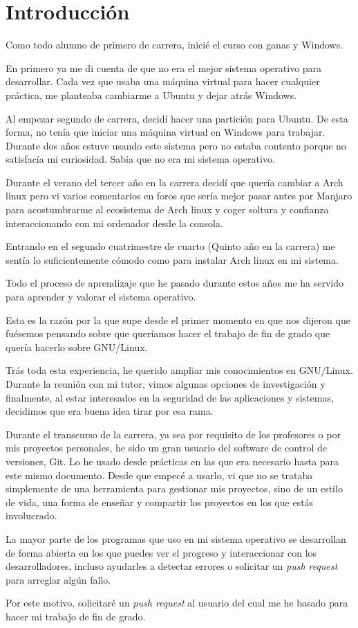 \documentclass[titlepage, 12pt, a4paper]{article}
\begin{document}
\section{Introducción}
Como todo alumno de primero de carrera, inicié el curso con ganas y Windows.\par En primero ya me di cuenta de que no era el mejor sistema operativo para desarrollar. Cada vez que usaba una máquina virtual para hacer cualquier práctica, me planteaba cambiarme a \Gls{Ubuntu} y dejar atrás Windows.\par Al empezar segundo de carrera, decidí hacer una partición para \Gls{Ubuntu}. De esta forma, no tenía que iniciar una máquina virtual en Windows para trabajar. Durante dos años estuve usando este sistema pero no estaba contento porque no satisfacía mi curiosidad. Sabía que no era mi sistema operativo.\par Durante el verano del tercer año en la carrera decidí que quería cambiar a \Gls{Arch linux} pero vi varios comentarios en foros que sería mejor pasar antes por \Gls{Manjaro} para acostumbrarme al ecosistema de \Gls{Arch linux} y coger soltura y confianza interaccionando con mi ordenador desde la consola.\par Entrando en el segundo cuatrimestre de cuarto (Quinto año en la carrera) me sentía lo suficientemente cómodo como para instalar \Gls{Arch linux} en mi sistema.\par Todo el proceso de aprendizaje que he pasado durante estos años me ha servido para aprender y valorar el sistema operativo.\par Esta es la razón por la que supe desde el primer momento en que nos dijeron que fuésemos pensando sobre que queríamos hacer el trabajo de fin de grado que quería hacerlo sobre \Gls{GNU/Linux}.\par Trás toda esta experiencia, he querido ampliar mis conocimientos en \Gls{GNU/Linux}. Durante la reunión con mi tutor, vimos algunas opciones de investigación y finalmente, al estar interesados en la seguridad de las aplicaciones y sistemas, decidimos que era buena idea tirar por esa rama.\par Durante el transcurso de la carrera, ya sea por requisito de los profesores o por mis proyectos personales, he sido un gran usuario del software de control de versiones, \Gls{Git}. Lo he usado desde prácticas en las que era necesario hasta para este mismo documento. Desde que empecé a usarlo, vi que no se trataba simplemente de una herramienta para gestionar mis proyectos, sino de un estilo de vida, una forma de enseñar y compartir los proyectos en los que estás involucrado.\par La mayor parte de los programas que uso en mi sistema operativo se desarrollan de forma abierta en los que puedes ver el progreso y interaccionar con los desarrolladores, incluso ayudarles a detectar errores o solicitar un \textit{push request} para arreglar algún fallo.\par Por este motivo, solicitaré un \textit{push request} al usuario del cual me he basado para hacer mi trabajo de fin de grado.
\end{document}
